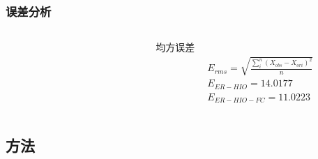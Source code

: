 \documentclass[12pt,aspectratio=169]{beamer} %
\begin{document}
\begin{frame}
    \frametitle{误差分析}
    \begin{columns}
        \begin{column}{0.7\textwidth}
            \begin{figure}
                \qquad
            \end{figure}
        \end{column}
        \begin{column}{0.3\textwidth}
            \begin{block}{均方误差}
                \small \begin{align*}
                    &E_{rms}=\sqrt{\frac{\sum_i^n (X_{obs}-X_{ori})^2}{n}}\\
                    &E_{ER-HIO}=14.0177\\
                    &E_{ER-HIO-FC}=11.0223
                \end{align*}
            \end{block}
        \end{column}
    \end{columns}
\end{frame}

\subsection{方法}
\end{document}
